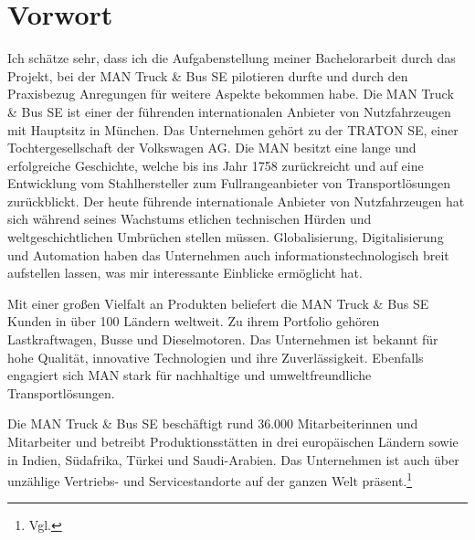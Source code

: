 \section*{Vorwort}
Ich schätze sehr, dass ich die Aufgabenstellung meiner Bachelorarbeit durch das Projekt, bei der MAN Truck \& Bus SE pilotieren durfte und durch den Praxisbezug Anregungen für weitere Aspekte bekommen habe. Die MAN Truck \& Bus SE ist einer der führenden internationalen Anbieter von Nutzfahrzeugen mit Hauptsitz in München. Das Unternehmen gehört zu der TRATON SE, einer Tochtergesellschaft der Volkswagen AG. Die MAN besitzt eine lange und erfolgreiche Geschichte, welche bis ins Jahr 1758 zurückreicht und auf eine Entwicklung vom Stahlhersteller zum Fullrangeanbieter von Transportlösungen zurückblickt. Der heute führende internationale Anbieter von Nutzfahrzeugen hat sich während seines Wachstums etlichen technischen Hürden und weltgeschichtlichen Umbrüchen stellen müssen. Globalisierung, Digitalisierung und Automation haben das Unternehmen auch informationstechnologisch breit aufstellen lassen, was mir interessante Einblicke ermöglicht hat.

Mit einer großen Vielfalt an Produkten beliefert die MAN Truck \& Bus SE Kunden in über 100 Ländern weltweit. Zu ihrem Portfolio gehören Lastkraftwagen, Busse und Dieselmotoren. Das Unternehmen ist bekannt für hohe Qualität, innovative Technologien und ihre Zuverlässigkeit. Ebenfalls engagiert sich MAN stark für nachhaltige und umweltfreundliche Transportlösungen.

Die MAN Truck \& Bus SE beschäftigt rund 36.000 Mitarbeiterinnen und Mitarbeiter und betreibt Produktionsstätten in drei europäischen Ländern sowie in Indien, Südafrika, Türkei und Saudi-Arabien. Das Unternehmen ist auch über unzählige Vertriebs- und Servicestandorte auf der ganzen Welt präsent.\footnote{Vgl. }